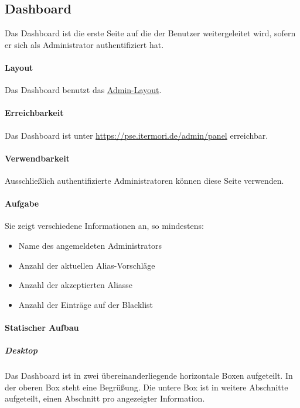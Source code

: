 \newpage
\subsection{Dashboard}\label{AP_Dashboard}

Das Dashboard ist die erste Seite auf die der Benutzer weitergeleitet wird, sofern er sich als Administrator authentifiziert hat.

\paragraph*{Layout}
Das Dashboard benutzt das \hyperref[AP_Admin_Layout]{Admin-Layout}.

\paragraph*{Erreichbarkeit}
Das Dashboard ist unter \href{https://pse.itermori.de/admin/panel}{https://pse.itermori.de/admin/panel} erreichbar.

\paragraph*{Verwendbarkeit}
Ausschließlich authentifizierte Administratoren können diese Seite verwenden.

\paragraph*{Aufgabe}
Sie zeigt verschiedene Informationen an, so mindestens:

\begin{itemize}
    \item Name des angemeldeten Administrators
    \item Anzahl der aktuellen Alias-Vorschläge
    \item Anzahl der akzeptierten Aliasse
    \item Anzahl der Einträge auf der Blacklist
\end{itemize}

\paragraph*{Statischer Aufbau}
\subparagraph*{Desktop}
Das Dashboard ist in zwei übereinanderliegende horizontale Boxen aufgeteilt.
In der oberen Box steht eine Begrüßung.
Die untere Box ist in weitere Abschnitte aufgeteilt, einen Abschnitt pro angezeigter Information.

